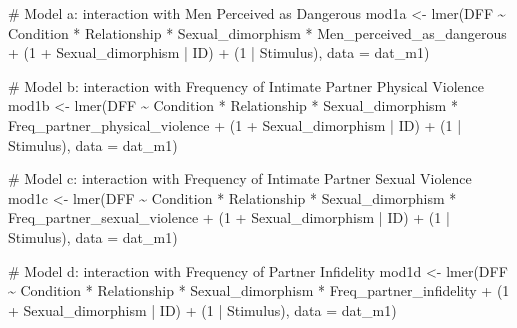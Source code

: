 \documentclass[
  bookmarksnumbered]{article}
\newenvironment{Shaded}{\begin{snugshade}}{\end{snugshade}}
\newcommand{\AttributeTok}[1]{\textcolor[rgb]{0.80,0.80,0.80}{#1}}
\newcommand{\CommentTok}[1]{\textcolor[rgb]{0.50,0.62,0.50}{#1}}
\newcommand{\DecValTok}[1]{\textcolor[rgb]{0.86,0.86,0.80}{#1}}
\newcommand{\FunctionTok}[1]{\textcolor[rgb]{0.94,0.94,0.56}{#1}}
\newcommand{\NormalTok}[1]{\textcolor[rgb]{0.80,0.80,0.80}{#1}}
\newcommand{\OtherTok}[1]{\textcolor[rgb]{0.94,0.94,0.56}{#1}}
\newcommand{\SpecialCharTok}[1]{\textcolor[rgb]{0.86,0.64,0.64}{#1}}
\begin{document}
\begin{Shaded}
\begin{Highlighting}[]
\CommentTok{\# Model a: interaction with Men Perceived as Dangerous}
\NormalTok{mod1a }\OtherTok{\textless{}{-}} \FunctionTok{lmer}\NormalTok{(DFF }\SpecialCharTok{\textasciitilde{}}
\NormalTok{                Condition }\SpecialCharTok{*}\NormalTok{ Relationship }\SpecialCharTok{*}\NormalTok{ Sexual\_dimorphism }\SpecialCharTok{*}\NormalTok{ Men\_perceived\_as\_dangerous }\SpecialCharTok{+}
\NormalTok{                (}\DecValTok{1} \SpecialCharTok{+}\NormalTok{ Sexual\_dimorphism }\SpecialCharTok{|}\NormalTok{ ID) }\SpecialCharTok{+}\NormalTok{ (}\DecValTok{1} \SpecialCharTok{|}\NormalTok{ Stimulus), }
              \AttributeTok{data =}\NormalTok{ dat\_m1)}

\CommentTok{\# Model b: interaction with Frequency of Intimate Partner Physical Violence}
\NormalTok{mod1b }\OtherTok{\textless{}{-}} \FunctionTok{lmer}\NormalTok{(DFF }\SpecialCharTok{\textasciitilde{}}
\NormalTok{                Condition }\SpecialCharTok{*}\NormalTok{ Relationship }\SpecialCharTok{*}\NormalTok{ Sexual\_dimorphism }\SpecialCharTok{*}\NormalTok{ Freq\_partner\_physical\_violence }\SpecialCharTok{+}
\NormalTok{                (}\DecValTok{1} \SpecialCharTok{+}\NormalTok{ Sexual\_dimorphism }\SpecialCharTok{|}\NormalTok{ ID) }\SpecialCharTok{+}\NormalTok{ (}\DecValTok{1} \SpecialCharTok{|}\NormalTok{ Stimulus), }
              \AttributeTok{data =}\NormalTok{ dat\_m1)}

\CommentTok{\# Model c: interaction with Frequency of Intimate Partner Sexual Violence}
\NormalTok{mod1c }\OtherTok{\textless{}{-}} \FunctionTok{lmer}\NormalTok{(DFF }\SpecialCharTok{\textasciitilde{}}
\NormalTok{                Condition }\SpecialCharTok{*}\NormalTok{ Relationship }\SpecialCharTok{*}\NormalTok{ Sexual\_dimorphism }\SpecialCharTok{*}\NormalTok{ Freq\_partner\_sexual\_violence }\SpecialCharTok{+}
\NormalTok{                (}\DecValTok{1} \SpecialCharTok{+}\NormalTok{ Sexual\_dimorphism }\SpecialCharTok{|}\NormalTok{ ID) }\SpecialCharTok{+}\NormalTok{ (}\DecValTok{1} \SpecialCharTok{|}\NormalTok{ Stimulus), }
              \AttributeTok{data =}\NormalTok{ dat\_m1)}

\CommentTok{\# Model d: interaction with Frequency of Partner Infidelity}
\NormalTok{mod1d }\OtherTok{\textless{}{-}} \FunctionTok{lmer}\NormalTok{(DFF }\SpecialCharTok{\textasciitilde{}}
\NormalTok{                Condition }\SpecialCharTok{*}\NormalTok{ Relationship }\SpecialCharTok{*}\NormalTok{ Sexual\_dimorphism }\SpecialCharTok{*}\NormalTok{ Freq\_partner\_infidelity }\SpecialCharTok{+}
\NormalTok{                (}\DecValTok{1} \SpecialCharTok{+}\NormalTok{ Sexual\_dimorphism }\SpecialCharTok{|}\NormalTok{ ID) }\SpecialCharTok{+}\NormalTok{ (}\DecValTok{1} \SpecialCharTok{|}\NormalTok{ Stimulus), }
              \AttributeTok{data =}\NormalTok{ dat\_m1)}


\end{Highlighting}
\end{Shaded}
\end{document}
